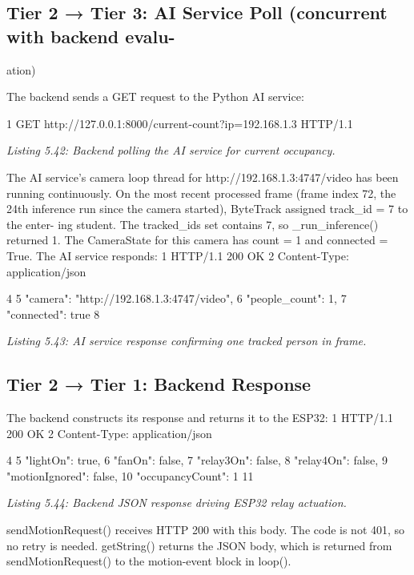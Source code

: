 \subsection{Tier 2 → Tier 3: AI Service Poll (concurrent with backend evalu-}

ation)

The backend sends a GET request to the Python AI service:

1 GET http://127.0.0.1:8000/current-count?ip=192.168.1.3 HTTP/1.1



\textit{Listing 5.42: Backend polling the AI service for current occupancy.}





The AI service's camera loop thread for http://192.168.1.3:4747/video has
been running continuously. On the most recent processed frame (frame index 72, the 24th
inference run since the camera started), ByteTrack assigned track\_id = 7 to the enter-
ing student. The tracked\_ids set contains {7}, so \_run\_inference() returned 1. The
CameraState for this camera has count = 1 and connected = True. The AI service
responds:
1 HTTP/1.1 200 OK
2 Content-Type: application/json


4 {
5 "camera": "http://192.168.1.3:4747/video",
6 "people\_count": 1,
7 "connected": true
8 }


\textit{Listing 5.43: AI service response conﬁrming one tracked person in frame.}





\subsection{Tier 2 → Tier 1: Backend Response}


The backend constructs its response and returns it to the ESP32:
1 HTTP/1.1 200 OK
2 Content-Type: application/json

4 {
5 "lightOn": true,
6 "fanOn": false,
7 "relay3On": false,
8 "relay4On": false,
9 "motionIgnored": false,
10 "occupancyCount": 1
11 }


\textit{Listing 5.44: Backend JSON response driving ESP32 relay actuation.}



sendMotionRequest() receives HTTP 200 with this body. The code is not 401,
so no retry is needed. getString() returns the JSON body, which is returned from
sendMotionRequest() to the motion-event block in loop().




